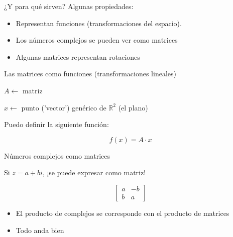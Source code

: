 \documentclass[10pt]{beamer}
\def\R{\mathbb{R}}
\begin{document}
\begin{frame}{¿Y para qué sirven?}
Algunas propiedades:
	\begin{itemize}
		\item Representan funciones (transformaciones del espacio).
		\item Los números complejos se pueden ver como matrices
		\item Algunas matrices representan rotaciones
	\end{itemize}
\end{frame}

\begin{frame}{Las matrices como funciones (transformaciones lineales)}

$ A \leftarrow$ matriz

$ x \leftarrow$ punto ('vector') genérico de $\R^2$ (el plano) \bigskip

Puedo definir la siguiente función:

\Huge $$f(x) = A\cdot x$$





\end{frame}


\begin{frame}{Números complejos como matrices}

Si $z=a+bi$, ¡se puede expresar como matriz! 

\[
\begin{bmatrix}
    a  &  -b      \\
    b  &  a      
\end{bmatrix}
\]

\begin{itemize}
	\item El producto de complejos se corresponde con el producto de matrices
	\item Todo anda bien
\end{itemize}
	




	
\end{frame}
\end{document}
